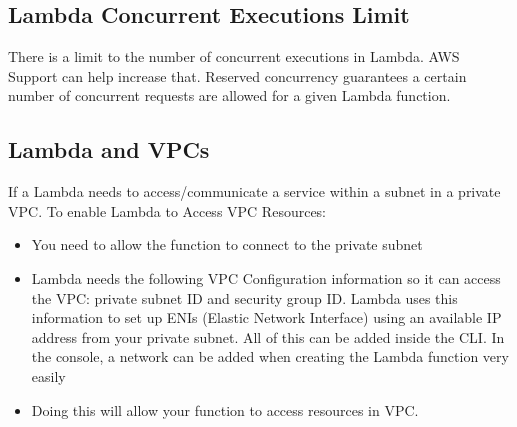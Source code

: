 \documentclass{article}%
\begin{document}
\subsection{Lambda Concurrent Executions Limit} 
There is a limit to the number of concurrent executions in Lambda. AWS Support can help increase that. Reserved concurrency guarantees a certain number of concurrent requests are allowed for a given Lambda function.
\subsection{Lambda and VPCs}
If a Lambda needs to access/communicate a service within a subnet in a private VPC. To enable Lambda to Access VPC Resources:
\begin{itemize}
    \item You need to allow the function to connect to the private subnet
    \item Lambda needs the following VPC Configuration information so it can access the VPC: private subnet ID and security group ID. Lambda uses this information to set up ENIs (Elastic Network Interface) using an available IP address from your private subnet. All of this can be added inside the CLI. In the console, a network can be added when creating the Lambda function very easily 
    \item Doing this will allow your function to access resources in VPC.
\end{itemize} 
\end{document}
